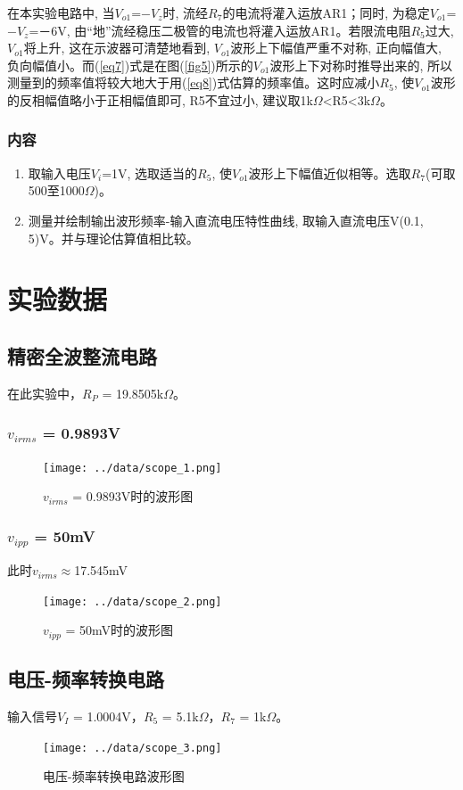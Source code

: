 \documentclass[a4paper]{article}
\begin{document}
在本实验电路中, 当$V_{o1}$=$-V_z$时, 流经$R_7$的电流将灌入运放AR1；同时, 为稳定$V_{o1}$=$-V_z$=－6V, 由“地”流经稳压二极管的电流也将灌入运放AR1。若限流电阻$R_5$过大, $V_{o1}$将上升, 这在示波器可清楚地看到,  $V_{o1}$波形上下幅值严重不对称, 正向幅值大, 负向幅值小。而(\ref{eq7})式是在图(\ref{fig5})所示的$V_{o1}$波形上下对称时推导出来的, 所以测量到的频率值将较大地大于用(\ref{eq8})式估算的频率值。这时应减小$R_5$, 使$V_{o1}$波形的反相幅值略小于正相幅值即可, R5不宜过小, 建议取1k$\Omega$<R5<3k$\Omega$。
\subsubsection{内容}
\begin{enumerate}
\item 取输入电压$V_i$=1V, 选取适当的$R_5$, 使$V_{o1}$波形上下幅值近似相等。选取$R_7$(可取500至1000$\Omega$)。
\item 测量并绘制输出波形频率-输入直流电压特性曲线, 取输入直流电压V(0.1, 5)V。并与理论估算值相比较。
\end{enumerate}

\section{实验数据}
\subsection{精密全波整流电路}
在此实验中，$R_P$ = 19.8505k$\Omega$。
\subsubsection{$v_{irms}$ = 0.9893V}
\begin{figure}[!h]
\centering
\texttt{[image: ../data/scope\_1.png]}\\
\caption{$v_{irms}$ = 0.9893V时的波形图}\label{datafig1}
\end{figure}
\subsubsection{$v_{ipp}$ = 50mV}
此时$v_{irms}\approx$17.545mV
\begin{figure}[!h]
\centering
\texttt{[image: ../data/scope\_2.png]}\\
\caption{$v_{ipp}$ = 50mV时的波形图}\label{datafig2}
\end{figure}

\subsection{电压-频率转换电路}
输入信号$V_I$ = 1.0004V，$R_5$ = 5.1k$\Omega$，$R_7$ = 1k$\Omega$。
\begin{figure}[!h]
\centering
\texttt{[image: ../data/scope\_3.png]}\\
\caption{电压-频率转换电路波形图}\label{datafig3}
\end{figure}
\end{document}
